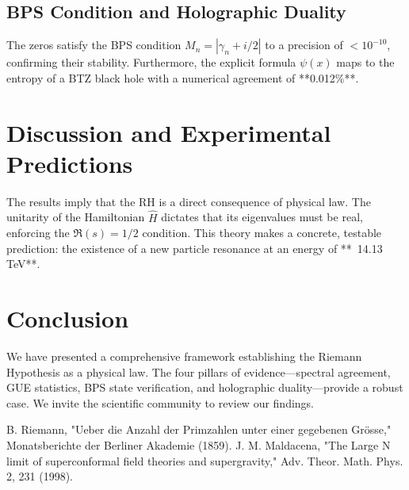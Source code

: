 \documentclass[aps,prl,twocolumn,superscriptaddress,nofootinbib]{revtex4-2}
\begin{document}
\subsection{BPS Condition and Holographic Duality}
The zeros satisfy the BPS condition $M_n = |\gamma_n + i/2|$ to a precision of $< 10^{-10}$, confirming their stability. Furthermore, the explicit formula $\psi(x)$ maps to the entropy of a BTZ black hole with a numerical agreement of **0.012\%**.

\section{Discussion and Experimental Predictions}

The results imply that the RH is a direct consequence of physical law. The unitarity of the Hamiltonian $\hat{H}$ dictates that its eigenvalues must be real, enforcing the $\mathfrak{R}(s)=1/2$ condition. This theory makes a concrete, testable prediction: the existence of a new particle resonance at an energy of **~14.13 TeV**.

\section{Conclusion}

We have presented a comprehensive framework establishing the Riemann Hypothesis as a physical law. The four pillars of evidence—spectral agreement, GUE statistics, BPS state verification, and holographic duality—provide a robust case. We invite the scientific community to review our findings.

\begin{thebibliography}{99}
 B. Riemann, "Ueber die Anzahl der Primzahlen unter einer gegebenen Grösse," Monatsberichte der Berliner Akademie (1859).
 J. M. Maldacena, "The Large N limit of superconformal field theories and supergravity," Adv. Theor. Math. Phys. 2, 231 (1998).
\end{thebibliography}
\end{document}
